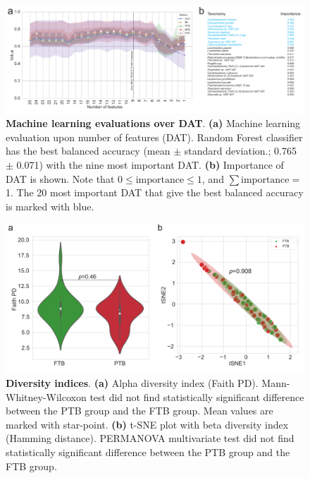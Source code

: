 \documentclass[11pt, a4paper, onecolumn, oneside]{report}
\begin{document}
            \begin{figure}[p]
                \centering
                \includegraphics[width=15 cm]{Figures/PTB/Fig3-ML.pdf}
                \caption[Machine learning evaluations over DAT]{\textbf{Machine learning evaluations over DAT}. \textbf{(a)} Machine learning evaluation upon number of features (DAT). Random Forest classifier has the best balanced accuracy (mean $\pm$ standard deviation.; 0.765 $\pm$ 0.071) with the nine most important DAT. \textbf{(b)} Importance of DAT is shown. Note that $0 \le \textrm{importance} \le 1$, and $\sum \textrm{importance} =$ 1. The 20 most important DAT that give the best balanced accuracy is marked with blue.}
                \label{fig:PTB-ML}
            \end{figure}
            \clearpage

            \begin{figure}[p]
                \centering
                \includegraphics[width=15 cm]{Figures/PTB/FigS1-Diversity.pdf}
                \caption[Diversity indices]{\textbf{Diversity indices}. \textbf{(a)} Alpha diversity index (Faith PD). Mann-Whitney-Wilcoxon test did not find statistically significant difference between the PTB group and the FTB group. Mean values are marked with star-point. \textbf{(b)} t-SNE plot with beta diversity index (Hamming distance). PERMANOVA multivariate test did not find statistically significant difference between the PTB group and the FTB group.}
                \label{fig:PTB-diversity}
            \end{figure}
            \clearpage
\end{document}
